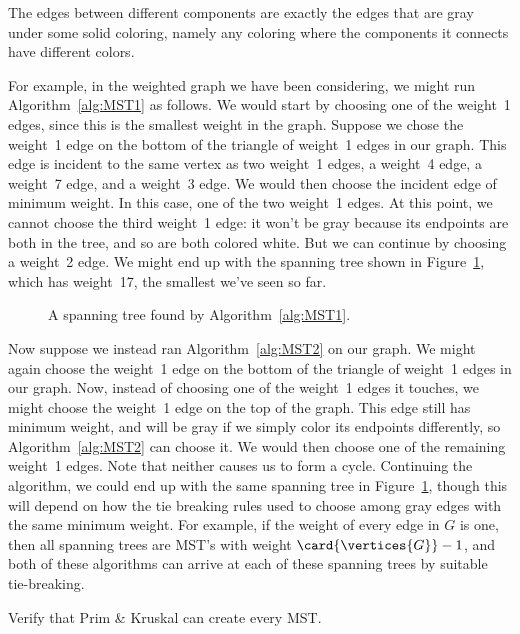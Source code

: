 The edges between different components are exactly the edges that are
gray under some solid coloring, namely any coloring where the
components it connects have different colors.

For example, in the weighted graph we have been considering, we might
run Algorithm~\ref{alg:MST1} as follows.  We would start by choosing
one of the weight~1 edges, since this is the smallest weight in the
graph.  Suppose we chose the weight~1 edge on the bottom of the
triangle of weight~1 edges in our graph.  This edge is incident to the
same vertex as two weight~1 edges, a weight~4 edge, a weight~7 edge,
and a weight~3 edge.  We would then choose the incident edge of
minimum weight.  In this case, one of the two weight~1 edges.  At this
point, we cannot choose the third weight~1 edge: it won't be gray
because its endpoints are both in the tree, and so are both colored
white.  But we can continue by choosing a weight~2 edge.  We might end
up with the spanning tree shown in Figure~\ref{fig:5KC}, which has
weight~17, the smallest we've seen so far.

\begin{figure}


\caption{A spanning tree found by Algorithm~\ref{alg:MST1}.}

\label{fig:5KC}

\end{figure}

Now suppose we instead ran Algorithm~\ref{alg:MST2} on our graph.  We
might again choose the weight~1 edge on the bottom of the triangle of
weight~1 edges in our graph.  Now, instead of choosing one of the
weight~1 edges it touches, we might choose the weight~1 edge on the
top of the graph.  This edge still has minimum weight, and will be
gray if we simply color its endpoints differently, so
Algorithm~\ref{alg:MST2} can choose it.  We would then choose one of
the remaining weight~1 edges.  Note that neither causes us to form a
cycle.  Continuing the algorithm, we could end up with the same
spanning tree in Figure~\ref{fig:5KC}, though this will depend on how
the tie breaking rules used to choose among gray edges with the same
minimum weight.  For example, if the weight of every edge in $G$ is
one, then all spanning trees are MST's with weight
$\card{\vertices{G}}-1$, and both of these algorithms can arrive at
each of these spanning trees by suitable tie-breaking.

\begin{editingnotes}
Verify that Prim \& Kruskal can create every MST.
\end{editingnotes}

